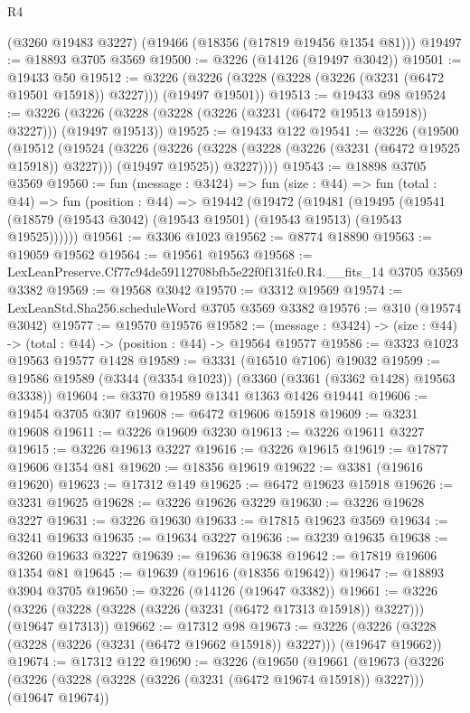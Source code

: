 \begin{lexlean}{R4}
\begin{coremodule}
    (@3260 @19483 @3227)
    (@19466 (@18356 (@17819 @19456 @1354 @81)))
@19497 := @18893 @3705 @3569
@19500 := @3226 (@14126 (@19497 @3042))
@19501 := @19433 @50
@19512 := @3226 (@3226 (@3228 (@3228 (@3226 (@3231 (@6472 @19501 @15918)) @3227))) (@19497 @19501))
@19513 := @19433 @98
@19524 := @3226 (@3226 (@3228 (@3228 (@3226 (@3231 (@6472 @19513 @15918)) @3227))) (@19497 @19513))
@19525 := @19433 @122
@19541 := @3226
    (@19500
      (@19512
        (@19524
          (@3226
            (@3226 (@3228 (@3228 (@3226 (@3231 (@6472 @19525 @15918)) @3227))) (@19497 @19525))
            @3227))))
@19543 := @18898 @3705 @3569
@19560 := fun (message : @3424) =>
  fun (size : @44) =>
  fun (total : @44) =>
  fun (position : @44) =>
  @19442
    (@19472
      (@19481
        (@19495 (@19541 (@18579 (@19543 @3042) (@19543 @19501) (@19543 @19513) (@19543 @19525))))))
@19561 := @3306 @1023
@19562 := @8774 @18890
@19563 := @19059 @19562
@19564 := @19561 @19563
@19568 := LexLeanPreserve.Cf77c94de59112708bfb5e22f0f131fc0.R4.__fits_14 @3705 @3569 @3382
@19569 := @19568 @3042
@19570 := @3312 @19569
@19574 := LexLeanStd.Sha256.scheduleWord @3705 @3569 @3382
@19576 := @310 (@19574 @3042)
@19577 := @19570 @19576
@19582 := (message : @3424) -> (size : @44) -> (total : @44) -> (position : @44) -> @19564 @19577
@19586 := @3323 @1023 @19563 @19577 @1428
@19589 := @3331 (@16510 @7106) @19032
@19599 := @19586 @19589 (@3344 (@3354 @1023)) (@3360 (@3361 (@3362 @1428) @19563 @3338))
@19604 := @3370 @19589 @1341 @1363 @1426 @19441
@19606 := @19454 @3705 @307
@19608 := @6472 @19606 @15918
@19609 := @3231 @19608
@19611 := @3226 @19609 @3230
@19613 := @3226 @19611 @3227
@19615 := @3226 @19613 @3227
@19616 := @3226 @19615
@19619 := @17877 @19606 @1354 @81
@19620 := @18356 @19619
@19622 := @3381 (@19616 @19620)
@19623 := @17312 @149
@19625 := @6472 @19623 @15918
@19626 := @3231 @19625
@19628 := @3226 @19626 @3229
@19630 := @3226 @19628 @3227
@19631 := @3226 @19630
@19633 := @17815 @19623 @3569
@19634 := @3241 @19633
@19635 := @19634 @3227
@19636 := @3239 @19635
@19638 := @3260 @19633 @3227
@19639 := @19636 @19638
@19642 := @17819 @19606 @1354 @81
@19645 := @19639 (@19616 (@18356 @19642))
@19647 := @18893 @3904 @3705
@19650 := @3226 (@14126 (@19647 @3382))
@19661 := @3226 (@3226 (@3228 (@3228 (@3226 (@3231 (@6472 @17313 @15918)) @3227))) (@19647 @17313))
@19662 := @17312 @98
@19673 := @3226 (@3226 (@3228 (@3228 (@3226 (@3231 (@6472 @19662 @15918)) @3227))) (@19647 @19662))
@19674 := @17312 @122
@19690 := @3226
    (@19650
      (@19661
        (@19673
          (@3226
            (@3226 (@3228 (@3228 (@3226 (@3231 (@6472 @19674 @15918)) @3227))) (@19647 @19674))

\end{coremodule}
\end{lexlean}
